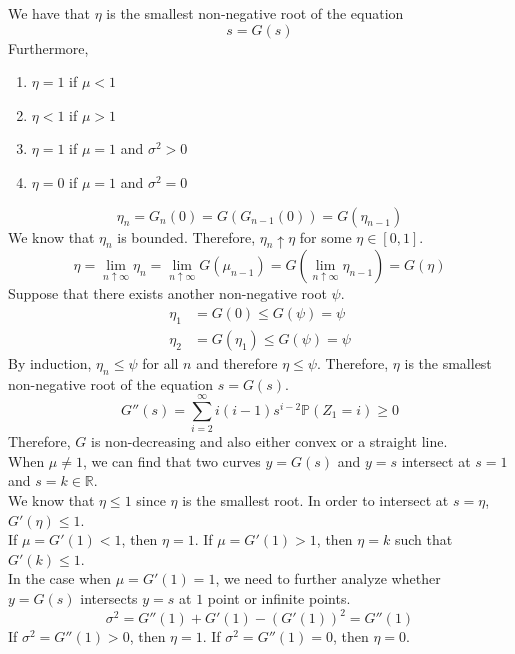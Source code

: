 \documentclass{huhtakm-template-book}
\newcommand{\prob}{\mathbb{P}}
\begin{document}
    \begin{thm}
        We have that $\eta$ is the smallest non-negative root of the equation
        \begin{equation*}
            s=G(s)
        \end{equation*}
        Furthermore,
        \begin{enumerate}
            \item $\eta=1$ if $\mu<1$
            \item $\eta<1$ if $\mu>1$
            \item $\eta=1$ if $\mu=1$ and $\sigma^{2}>0$
            \item $\eta=0$ if $\mu=1$ and $\sigma^{2}=0$
        \end{enumerate}
    \end{thm}
    \begin{proofing}
        \begin{equation*}
            \eta_{n}=G_{n}(0)=G(G_{n-1}(0))=G(\eta_{n-1})
        \end{equation*}
        We know that $\eta_{n}$ is bounded. Therefore, $\eta_{n}\uparrow\eta$ for some $\eta\in[0,1]$.
        \begin{equation*}
            \eta=\lim_{n\uparrow\infty}\eta_{n}=\lim_{n\uparrow\infty}G(\mu_{n-1})=G\left(\lim_{n\uparrow\infty}\eta_{n-1}\right)=G(\eta)
        \end{equation*}
        Suppose that there exists another non-negative root $\psi$.
        \begin{align*}
            \eta_{1}&=G(0)\leq G(\psi)=\psi\\
            \eta_{2}&=G(\eta_{1})\leq G(\psi)=\psi
        \end{align*}
        By induction, $\eta_{n}\leq\psi$ for all $n$ and therefore $\eta\leq\psi$. Therefore, $\eta$ is the smallest non-negative root of the equation $s=G(s)$.
        \begin{equation*}
            G''(s)=\sum_{i=2}^{\infty}i(i-1)s^{i-2}\prob(Z_{1}=i)\geq 0
        \end{equation*}
        Therefore, $G$ is non-decreasing and also either convex or a straight line.\\
        When $\mu\neq 1$, we can find that two curves $y=G(s)$ and $y=s$ intersect at $s=1$ and $s=k\in\mathbb{R}$.\\
        We know that $\eta\leq 1$ since $\eta$ is the smallest root. In order to intersect at $s=\eta$, $G'(\eta)\leq 1$.\\
        If $\mu=G'(1)<1$, then $\eta=1$. If $\mu=G'(1)>1$, then $\eta=k$ such that $G'(k)\leq 1$.\\
        In the case when $\mu=G'(1)=1$, we need to further analyze whether $y=G(s)$ intersects $y=s$ at $1$ point or infinite points.
        \begin{equation*}
            \sigma^{2}=G''(1)+G'(1)-(G'(1))^{2}=G''(1)
        \end{equation*}
        If $\sigma^{2}=G''(1)>0$, then $\eta=1$. If $\sigma^{2}=G''(1)=0$, then $\eta=0$.
    \end{proofing}
\end{document}
